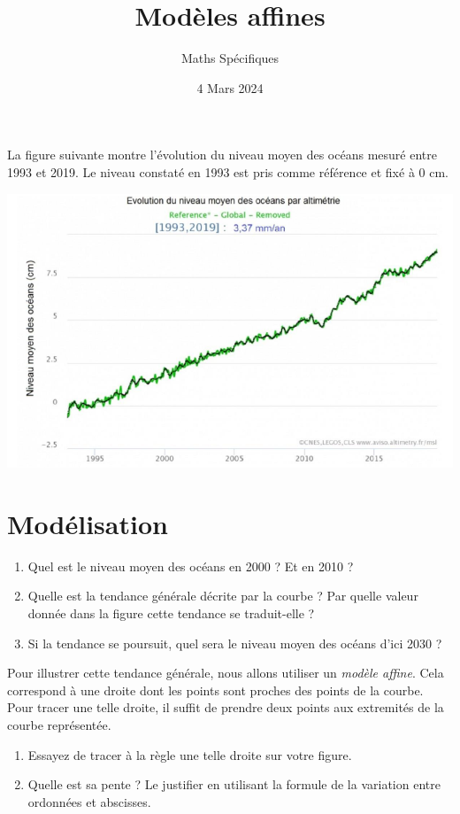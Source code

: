 \documentclass{article}
\author{Maths Spécifiques}
\date{4 Mars 2024}
\title{Modèles affines}
\begin{document}
\maketitle

La figure suivante montre l'évolution du niveau moyen des océans mesuré
entre 1993 et 2019. Le niveau constaté en 1993 est pris comme référence et
fixé à 0 cm.

\begin{center}
\includegraphics[scale=0.6]{NiveauOcean.png}
\end{center}
\section{Modélisation}
\begin{enumerate}
\item Quel est le niveau moyen des océans en 2000 ? Et en 2010 ?
\item Quelle est la tendance générale décrite par la courbe ? Par quelle valeur donnée dans la figure cette tendance se traduit-elle ?
\item Si la tendance se poursuit, quel sera le niveau moyen des océans d'ici 2030 ? 
\end{enumerate}
Pour illustrer cette tendance générale, nous allons utiliser un \emph{modèle affine}. Cela correspond à une droite dont les points sont proches des points de la courbe. Pour tracer une telle droite, il suffit de prendre deux points aux \og extremités \fg de la courbe représentée.
\begin{enumerate}[resume*]
\item Essayez de tracer à la règle une telle droite sur votre figure.
\item Quelle est sa pente ? Le justifier en utilisant la formule de la variation entre ordonnées et abscisses.
\end{enumerate}
\end{document}
